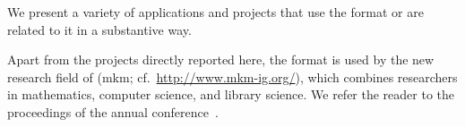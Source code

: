 
We present a variety of applications and projects that use the {\omdoc} format or are
related to it in a substantive way.

Apart from the projects directly reported here, the {\omdoc} format is used by the new
research field of {} ({\sc mkm};
cf.~\url{http://www.mkm-ig.org/}), which combines researchers in mathematics, computer
science, and library science. We refer the reader to the proceedings of the annual
{} conference~\cite{MKM01,MKM03,MKM04,MKM05,MKM06}.



